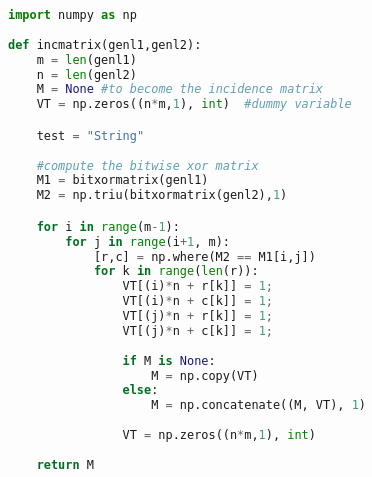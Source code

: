 \begin{lstlisting}[language=Python, caption=Code snippet example]
import numpy as np
    
def incmatrix(genl1,genl2):
    m = len(genl1)
    n = len(genl2)
    M = None #to become the incidence matrix
    VT = np.zeros((n*m,1), int)  #dummy variable

    test = "String"
    
    #compute the bitwise xor matrix
    M1 = bitxormatrix(genl1)
    M2 = np.triu(bitxormatrix(genl2),1) 

    for i in range(m-1):
        for j in range(i+1, m):
            [r,c] = np.where(M2 == M1[i,j])
            for k in range(len(r)):
                VT[(i)*n + r[k]] = 1;
                VT[(i)*n + c[k]] = 1;
                VT[(j)*n + r[k]] = 1;
                VT[(j)*n + c[k]] = 1;
                
                if M is None:
                    M = np.copy(VT)
                else:
                    M = np.concatenate((M, VT), 1)
                
                VT = np.zeros((n*m,1), int)
    
    return M
\end{lstlisting}






%
%
%	    
%	    
